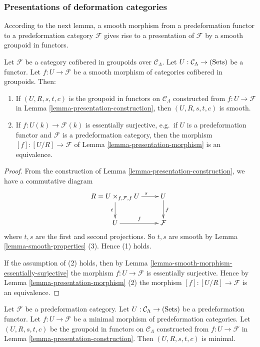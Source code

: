\subsubsection{Presentations of deformation categories}
According to the next lemma, a smooth morphism from a predeformation functor to 
a predeformation category $\mathcal F$ gives rise to a presentation of 
$\mathcal F$ by a smooth groupoid in functors.
\begin{lemma}
\label{lemma-smooth-groupoid-in-functors-construction}
Let $\mathcal F$ be a category cofibered in groupoids over $\mathcal 
C_{\Lambda}$.  Let $U: \mathcal C_{\Lambda} \rightarrow \textnormal{(Sets)}$ be 
a functor.  Let $f: U \rightarrow \mathcal F$ be a smooth morphism of 
categories cofibered in groupoids. Then:
\begin{enumerate}
\item If $(U,R,s,t,c)$ is the groupoid in functors on $\mathcal C_{\Lambda}$ 
constructed from $f: U \rightarrow \mathcal F$ in Lemma 
\ref{lemma-presentation-construction}, then $(U,R,s,t,c)$ is smooth. 
\item If $f: U(k) \rightarrow \mathcal F(k)$ is essentially surjective, e.g.\ 
if $U$ is a predeformation functor and $\mathcal F$ is a predeformation 
category, then the morphism $[f]: [U/R] \rightarrow \mathcal F$ of Lemma 
\ref{lemma-presentation-morphism} is an equivalence.
\end{enumerate}
\end{lemma}

\begin{proof}
From the construction of Lemma \ref{lemma-presentation-construction}, we have a 
commutative diagram
\[
\xymatrix{
R = U \times_{f,\mathcal F, f} U \ar[r]^{\hspace{7mm} s} \ar[d]_{t} & U 
\ar[d]^{f} \\
U \ar[r]^{f} & \mathcal F
}
\]
where $t,s$ are the first and second projections.  So $t,s$ are smooth by Lemma 
\ref{lemma-smooth-properties} (3).  Hence (1) holds.

\medskip \noindent
If the assumption of (2) holds, then by Lemma 
\ref{lemma-smooth-morphism-essentially-surjective} the morphism $f: U 
\rightarrow \mathcal F$ is essentially surjective. Hence by Lemma 
\ref{lemma-presentation-morphism} (2) the morphism $[f]: [U/R] \rightarrow 
\mathcal F$ is an equivalence.
\end{proof}

\begin{lemma}
\label{lemma-minimal-groupoid-in-functors-construction}
Let $\mathcal F$ be a predeformation category.  Let $U: \mathcal C_{\Lambda} 
\rightarrow \textnormal{(Sets)}$ be a predeformation functor.  Let $f: U 
\rightarrow \mathcal F$ be a minimal morphism of predeformation categories. Let 
$(U,R,s,t,c)$ be the groupoid in functors on $\mathcal C_{\Lambda}$ constructed 
from $f: U \rightarrow \mathcal F$ in Lemma 
\ref{lemma-presentation-construction}.  Then $(U,R,s,t,c)$ is minimal. 
\end{lemma}

